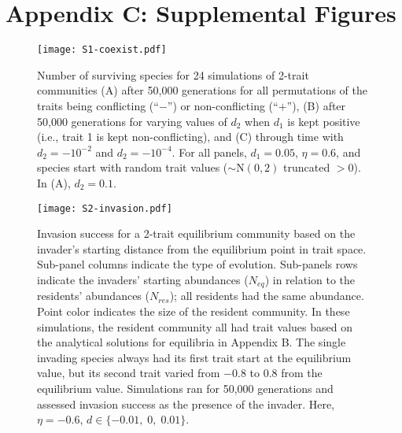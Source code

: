 \section*{Appendix C: Supplemental Figures}

\renewcommand{\thefigure}{C\arabic{figure}}
\renewcommand{\theequation}{C\arabic{equation}}
\renewcommand{\thetable}{C\arabic{table}}
\setcounter{equation}{0}
\setcounter{figure}{0}
\setcounter{table}{0}



\begin{figure}[ht!]
\centering
\texttt{[image: S1-coexist.pdf]}
\caption{Number of surviving species for 24 simulations of 2-trait 
    communities
    (A) after 50,000 generations for all permutations of the traits
    being conflicting (``$-$'') or non-conflicting (``$+$''),
    (B) after 50,000 generations for varying values of $d_2$ when 
    $d_1$ is kept positive (i.e., trait 1 is kept non-conflicting), and
    (C) through time with $d_2 = -10^{-2}$ and $d_2 = -10^{-4}$.
    For all panels, $d_1 = 0.05$, $\eta = 0.6$, and species start with
    random trait values ($\sim \text{N}(0,2)$ truncated $> 0$).
    In (A), $d_2 = 0.1$.}
\label{fig:coexist}
\end{figure}


\begin{figure}[ht!]
\centering
\texttt{[image: S2-invasion.pdf]}
\caption{Invasion success for a 2-trait equilibrium community based on
    the invader's starting distance from the equilibrium point in trait space.
    Sub-panel columns indicate the type of evolution.
    Sub-panels rows indicate the invaders' starting
    abundances ($N_{eq}$) in relation to the residents'
    abundances ($N_{res}$); all residents had the same
    abundance.
    Point color indicates the size of the resident community.
    In these simulations, the resident community all had
    trait values based on the analytical solutions for equilibria
    in Appendix B.
    The single invading species always had its first trait start
    at the equilibrium value, but its second trait 
    varied from
    $-0.8$ to $0.8$ from the equilibrium value.
    Simulations ran for 50,000 generations and assessed invasion 
    success as the presence of the invader.
    Here, $\eta = -0.6$, $d \in \{ -0.01, \; 0, \; 0.01 \}$.
}
\label{fig:invasion}
\end{figure}



